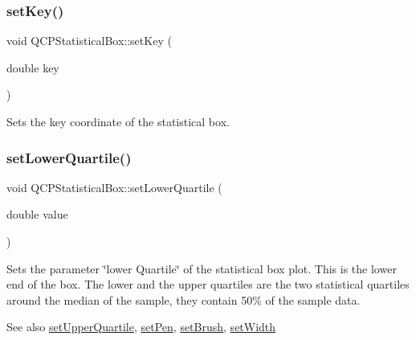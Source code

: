 \subsubsection{\texorpdfstring{set\+Key()}{setKey()}}
{\footnotesize\ttfamily void Q\+C\+P\+Statistical\+Box\+::set\+Key (\begin{DoxyParamCaption}\item[{double}]{key }\end{DoxyParamCaption})}

Sets the key coordinate of the statistical box. \mbox{\label{class_q_c_p_statistical_box_a680941af5e23d902013962fa67223f9e}} 
\subsubsection{\texorpdfstring{set\+Lower\+Quartile()}{setLowerQuartile()}}
{\footnotesize\ttfamily void Q\+C\+P\+Statistical\+Box\+::set\+Lower\+Quartile (\begin{DoxyParamCaption}\item[{double}]{value }\end{DoxyParamCaption})}

Sets the parameter \char`\"{}lower Quartile\char`\"{} of the statistical box plot. This is the lower end of the box. The lower and the upper quartiles are the two statistical quartiles around the median of the sample, they contain 50\% of the sample data.

\begin{DoxySeeAlso}{See also}
\mbox{\hyperlink{class_q_c_p_statistical_box_a65a1375f941c5a2077b5201229e89346}{set\+Upper\+Quartile}}, \mbox{\hyperlink{class_q_c_p_abstract_plottable_ab74b09ae4c0e7e13142fe4b5bf46cac7}{set\+Pen}}, \mbox{\hyperlink{class_q_c_p_abstract_plottable_a7a4b92144dca6453a1f0f210e27edc74}{set\+Brush}}, \mbox{\hyperlink{class_q_c_p_statistical_box_a0b62775bd67301b1eba5c785f2b26f14}{set\+Width}} 
\end{DoxySeeAlso}
\mbox{\label{class_q_c_p_statistical_box_acec5ad1901f00f2c5387cfb4d9787eb3}} 
